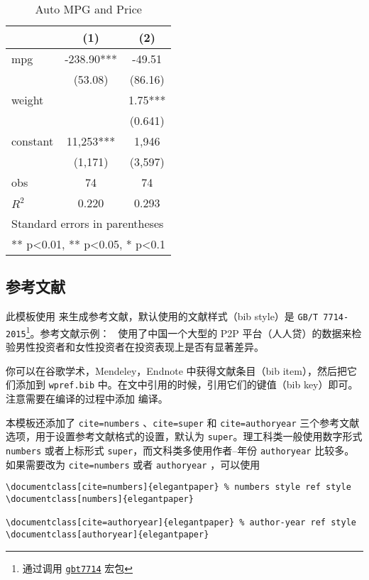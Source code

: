 \documentclass[lang=cn,11pt,numbers, a4paper]{elegantpaper}
\begin{document}
\begin{table}[htbp]
  \small
  \centering
  \caption{Auto MPG and Price \label{tab:reg}}
    \begin{tabular}{lcc}
    \toprule
                    &       (1)         &        (2)      \\
    \midrule
    mpg             &    -238.90***     &      -49.51     \\
                    &     (53.08)       &      (86.16)    \\
    weight          &                   &      1.75***    \\
                    &                   &      (0.641)    \\
    constant        &     11,253***     &       1,946     \\
                    &     (1,171)       &      (3,597)   \\
    obs             &        74         &         74     \\
    $R^2$           &      0.220        &       0.293    \\
    \bottomrule
    \multicolumn{3}{l}{\scriptsize Standard errors in parentheses} \\
    \multicolumn{3}{l}{\scriptsize *** p<0.01, ** p<0.05, * p<0.1} \\
    \end{tabular}%
\end{table}%



\subsection{参考文献}
此模板使用  来生成参考文献，默认使用的文献样式（bib style）是 \lstinline{GB/T 7714-2015}\footnote{通过调用 \href{https://ctan.org/pkg/gbt7714}{\lstinline{gbt7714}} 宏包}。参考文献示例：~\cite{en3} 使用了中国一个大型的 P2P 平台（人人贷）的数据来检验男性投资者和女性投资者在投资表现上是否有显著差异。

你可以在谷歌学术，Mendeley，Endnote 中获得文献条目（bib item），然后把它们添加到 \lstinline{wpref.bib} 中。在文中引用的时候，引用它们的键值（bib key）即可。注意需要在编译的过程中添加  编译。

本模板还添加了 \lstinline{cite=numbers} 、\lstinline{cite=super} 和 \lstinline{cite=authoryear}  三个参考文献选项，用于设置参考文献格式的设置，默认为 \lstinline{super}。理工科类一般使用数字形式 \lstinline{numbers} 或者上标形式 \lstinline{super}，而文科类多使用作者--年份 \lstinline{authoryear} 比较多。如果需要改为 \lstinline{cite=numbers}  或者  \lstinline{authoryear} ，可以使用
\begin{lstlisting}
\documentclass[cite=numbers]{elegantpaper} % numbers style ref style
\documentclass[numbers]{elegantpaper}

\documentclass[cite=authoryear]{elegantpaper} % author-year ref style
\documentclass[authoryear]{elegantpaper}
\end{lstlisting}
\end{document}

